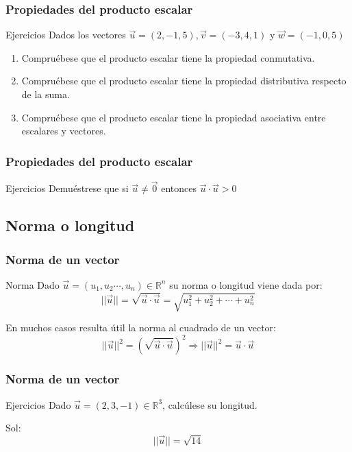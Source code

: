\documentclass{beamer}
\begin{document}
\begin{frame}
  \frametitle{Propiedades del producto escalar}
    \begin{block}{Ejercicios}
Dados los vectores $\vec u = (2,-1,5), \vec v = (-3,4,1)$ y $\vec w = (-1,0,5)$
\begin{enumerate}
\item Compru\'ebese que el producto escalar tiene la propiedad conmutativa.
\item Compru\'ebese que el producto escalar tiene la propiedad distributiva respecto de la suma.
\item Compru\'ebese que el producto escalar tiene la propiedad asociativa entre escalares y vectores.
\end{enumerate}
\end{block}
\end{frame}

\begin{frame}
  \frametitle{Propiedades del producto escalar}
    \begin{block}{Ejercicios}
Demu\'estrese que si $\vec u \neq \vec 0$ entonces $\vec u \cdot \vec u >0$
\end{block}
\end{frame}


\subsection{Norma o longitud}

\begin{frame}
  \frametitle{Norma de un vector}
    \begin{block}{Norma}
Dado $\vec u = (u_1,u_2\cdots,u_n)\in \mathbb R^n$ su norma o longitud viene dada por:
\[||\vec u || = \sqrt{\vec u \cdot \vec u} = \sqrt{u_1^2+u_2^2+\cdots+u_n^2}\]
\end{block}
En muchos casos resulta \'util la norma al cuadrado de un vector:
\[||\vec u||^2 = ( \sqrt{\vec u \cdot \vec u})^2 \Rightarrow ||\vec u||^2 = \vec u \cdot \vec u \]
\end{frame}


\begin{frame}
  \frametitle{Norma de un vector}
    \begin{block}{Ejercicios}
Dado $\vec u = (2,3,-1)\in \mathbb R^3$, calc\'ulese su longitud.
\end{block}
Sol: \[||\vec u|| = \sqrt{14} \]
\end{frame}
\end{document}
